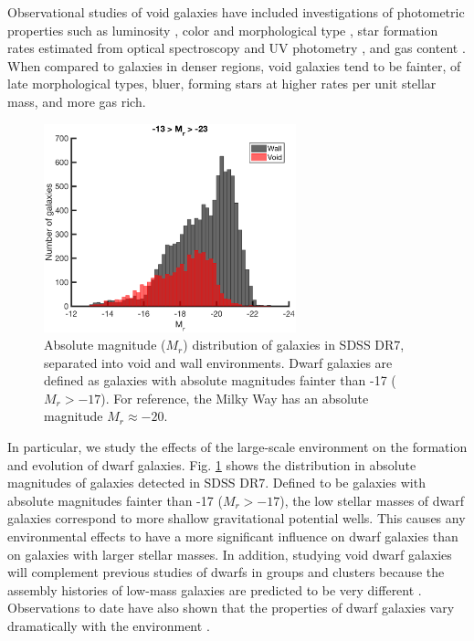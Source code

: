 Observational studies of void galaxies have included investigations of 
photometric properties such as luminosity \citep{Hoyle05,Croton05,Moorman15}, 
color and morphological type \citep{Grogin00,Rojas04,Patiri06,Park07,
vonBendaBeckmann08,Hoyle12}, star formation rates estimated from optical 
spectroscopy and UV photometry \citep{Rojas05,Moorman15,Beygu16}, and gas 
content \citep{Kreckel12,Moorman16,Jones16}.  When compared to galaxies in 
denser regions, void galaxies tend to be fainter, of late morphological types, 
bluer, forming stars at higher rates per unit stellar mass, and more gas rich.

\begin{figure}
    \includegraphics[width=0.65\textwidth]{Images/Intro/1sig_13-23_SDSS_Mr_hist_count_fill}
    \caption[Absolute magnitude distribution of galaxies in SDSS DR7]{Absolute 
    magnitude ($M_r$) distribution of galaxies in SDSS DR7, separated into void 
    and wall environments.  Dwarf galaxies are defined as galaxies with absolute 
    magnitudes fainter than -17 ($M_r > -17$).  For reference, the Milky Way has 
    an absolute magnitude $M_r \approx -20$.}
    \label{fig:Mr_SDSS}
\end{figure}

In particular, we study the effects of the large-scale environment on the 
formation and evolution of dwarf galaxies.  Fig. \ref{fig:Mr_SDSS} shows the 
distribution in absolute magnitudes of galaxies detected in SDSS DR7.  Defined 
to be galaxies with absolute magnitudes fainter than -17 ($M_r > -17$), the low 
stellar masses of dwarf galaxies correspond to more shallow gravitational 
potential wells.  This causes any environmental effects to have a more 
significant influence on dwarf galaxies than on galaxies with larger stellar 
masses.  In addition, studying void dwarf galaxies will complement previous 
studies of dwarfs in groups and clusters because the assembly histories of 
low-mass galaxies are predicted to be very different \citep[e.g.,][]{Gao07,
Lackner12}.  Observations to date have also shown that the properties of dwarf 
galaxies vary dramatically with the environment \citep[e.g.,][]{Ann08,Geha12}.



